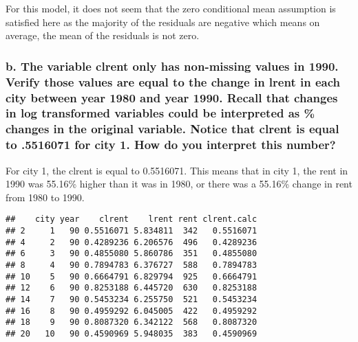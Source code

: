 \documentclass[
]{article}
\newenvironment{Shaded}{\begin{snugshade}}{\end{snugshade}}
\newcommand{\KeywordTok}[1]{\textcolor[rgb]{0.13,0.29,0.53}{\textbf{#1}}}
\newcommand{\NormalTok}[1]{#1}
\newcommand{\OperatorTok}[1]{\textcolor[rgb]{0.81,0.36,0.00}{\textbf{#1}}}
\newcommand{\StringTok}[1]{\textcolor[rgb]{0.31,0.60,0.02}{#1}}
\begin{document}
For this model, it does not seem that the zero conditional mean
assumption is satisfied here as the majority of the residuals are
negative which means on average, the mean of the residuals is not zero.

\hypertarget{b.-the-variable-clrent-only-has-non-missing-values-in-1990.-verify-those-values-are-equal-to-the-change-in-lrent-in-each-city-between-year-1980-and-year-1990.-recall-that-changes-in-log-transformed-variables-could-be-interpreted-as-changes-in-the-original-variable.-notice-that-clrent-is-equal-to-.5516071-for-city-1.-how-do-you-interpret-this-number}{%
\subsubsection{b. The variable clrent only has non-missing values in
1990. Verify those values are equal to the change in lrent in each city
between year 1980 and year 1990. Recall that changes in log transformed
variables could be interpreted as \% changes in the original variable.
Notice that clrent is equal to .5516071 for city 1. How do you interpret
this
number?}\label{b.-the-variable-clrent-only-has-non-missing-values-in-1990.-verify-those-values-are-equal-to-the-change-in-lrent-in-each-city-between-year-1980-and-year-1990.-recall-that-changes-in-log-transformed-variables-could-be-interpreted-as-changes-in-the-original-variable.-notice-that-clrent-is-equal-to-.5516071-for-city-1.-how-do-you-interpret-this-number}}

For city 1, the clrent is equal to 0.5516071. This means that in city 1,
the rent in 1990 was 55.16\% higher than it was in 1980, or there was a
55.16\% change in rent from 1980 to 1990.

\begin{verbatim}
##    city year    clrent    lrent rent clrent.calc
## 2     1   90 0.5516071 5.834811  342   0.5516071
## 4     2   90 0.4289236 6.206576  496   0.4289236
## 6     3   90 0.4855080 5.860786  351   0.4855080
## 8     4   90 0.7894783 6.376727  588   0.7894783
## 10    5   90 0.6664791 6.829794  925   0.6664791
## 12    6   90 0.8253188 6.445720  630   0.8253188
## 14    7   90 0.5453234 6.255750  521   0.5453234
## 16    8   90 0.4959292 6.045005  422   0.4959292
## 18    9   90 0.8087320 6.342122  568   0.8087320
## 20   10   90 0.4590969 5.948035  383   0.4590969
\end{verbatim}

\begin{Shaded}
\end{Shaded}
\end{document}
